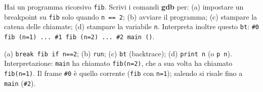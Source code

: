 \question[6]
Hai un programma ricorsivo \lstinline|fib|. Scrivi i comandi \textbf{gdb} per: (a) impostare un breakpoint su \lstinline|fib| solo quando \lstinline|n == 2|; (b) avviare il programma; (c) stampare la catena delle chiamate; (d) stampare la variabile \lstinline|n|.
Interpreta inoltre questo \lstinline|bt|: \lstinline|#0 fib (n=1) ... #1 fib (n=2) ... #2 main ()|.
\begin{solution}
(a) \lstinline|break fib if n==2|; (b) \lstinline|run|; (c) \lstinline|bt| (backtrace); (d) \lstinline|print n| (o \lstinline|p n|).\\
Interpretazione: \lstinline|main| ha chiamato \lstinline|fib(n=2)|, che a sua volta ha chiamato \lstinline|fib(n=1)|. Il frame \lstinline|#0| è quello corrente (\lstinline|fib| con \lstinline|n=1|); salendo si risale fino a \lstinline|main| (\lstinline|#2|).
\end{solution}
